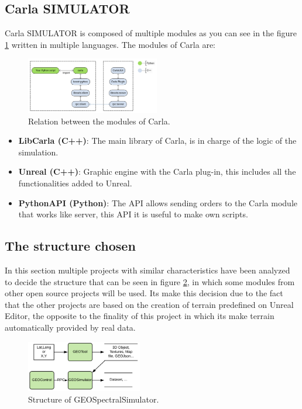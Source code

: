 \documentclass[10pt,a4paper,twocolumn,twoside]{article}
\begin{document}
\subsection{Carla SIMULATOR}

Carla SIMULATOR is composed of multiple modules as you can see in the figure \ref{fig-carlamodules} written in multiple languages. The modules of Carla are:

\begin{figure}[!h]
  	\includegraphics[width=0.52\textwidth]{carlamodules}
	\caption{Relation between the modules of Carla.}
	\label{fig-carlamodules}
\end{figure}

\begin{itemize}
\setlength\itemsep{0em}
 \item \textbf{LibCarla (C++)}: The main library of Carla, is in charge of the logic of the simulation.
 \item \textbf{Unreal (C++)}: Graphic engine with the Carla plug-in, this includes all the functionalities added to Unreal.
 \item \textbf{PythonAPI (Python)}: The API allows sending orders to the Carla module that works like server, this API it is useful to make own scripts.
\end{itemize}


\subsection{The structure chosen}

In this section multiple projects with similar characteristics have been analyzed to decide the structure that can be seen in figure \ref{fig-dronsimulatormodules}, in which some modules from other open source projects will be used. Its make this decision due to the fact that the other projects are based on the creation of terrain predefined on Unreal Editor, the opposite to the finality of this project in which its make terrain automatically provided by real data.

\begin{figure}[!h]
\centering
  	\includegraphics[width=0.45\textwidth]{structuretfg}
	\caption{Structure of GEOSpectralSimulator.}
	\label{fig-dronsimulatormodules}
\end{figure}
\end{document}
